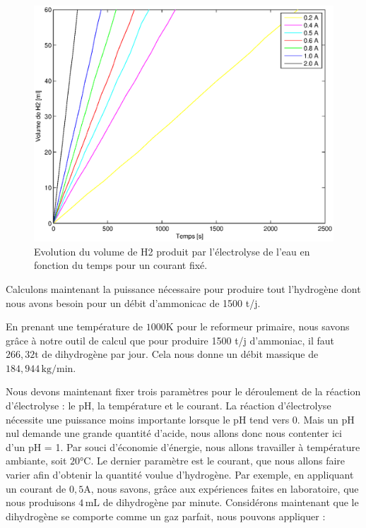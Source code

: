 \begin{figure}[h!]
	\begin{center}
		\includegraphics[scale=0.8]{../tache7/data/resultatsElectrolyse.eps}
	\end{center}
	\caption{Evolution du volume de H2 produit par l'électrolyse 
		de l'eau en fonction du temps pour un courant fixé.}
	\label{fig:dataElectrolyse}
\end{figure}

Calculons maintenant la puissance nécessaire pour produire tout l'hydrogène 
dont nous avons besoin pour un débit d'ammonicac de 1500 t/j.

En prenant une température de $1000 \si{\kelvin}$ pour le reformeur primaire, 
nous savons grâce à notre outil de calcul que pour produire 1500 t/j d'ammoniac, 
il faut $266,32 \si{\tonne}$ de dihydrogène 
par jour. Cela nous donne un débit massique de $184,944 \, \si{\kilo\gram/\minute}$.

Nous devons maintenant fixer trois paramètres pour le déroulement de 
la réaction d'électrolyse : le pH, la température et le courant.
La réaction d'électrolyse nécessite une puissance moins importante lorsque le pH tend vers 0. 
Mais un pH nul demande une grande quantité d'acide, nous allons donc nous contenter ici d'un pH = 1.
Par souci d'économie d'énergie, nous allons travailler à température ambiante, soit $20\si{\celsius}$.
Le dernier paramètre est le courant, que nous allons faire varier afin d'obtenir la quantité voulue d'hydrogène.
Par exemple, en appliquant un courant de $0,5 \si{\ampere}$, nous savons, grâce aux expériences faites en laboratoire, 
que nous produisons $4 \, \si{\milli\liter}$ de dihydrogène par minute. 
Considérons maintenant que le dihydrogène se comporte comme un gaz parfait, nous pouvons appliquer :

